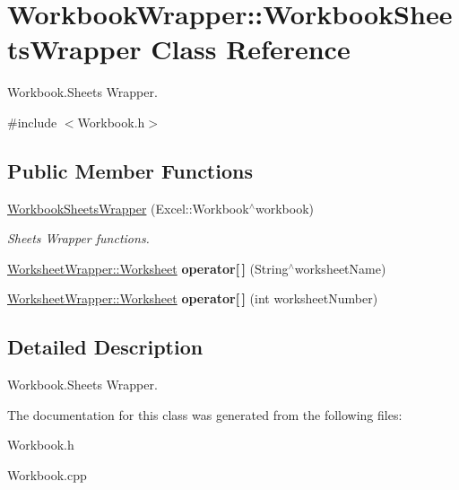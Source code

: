 \hypertarget{class_workbook_wrapper_1_1_workbook_sheets_wrapper}{}\section{Workbook\+Wrapper\+:\+:Workbook\+Sheets\+Wrapper Class Reference}
\label{class_workbook_wrapper_1_1_workbook_sheets_wrapper}


Workbook.\+Sheets Wrapper.  




{\ttfamily \#include $<$Workbook.\+h$>$}

\subsection*{Public Member Functions}
\begin{DoxyCompactItemize}
\item 
\hypertarget{class_workbook_wrapper_1_1_workbook_sheets_wrapper_a4e3774e38d74a6426fe398d6caa99d8b}{}\hyperlink{class_workbook_wrapper_1_1_workbook_sheets_wrapper_a4e3774e38d74a6426fe398d6caa99d8b}{Workbook\+Sheets\+Wrapper} (Excel\+::\+Workbook$^\wedge$workbook)\label{class_workbook_wrapper_1_1_workbook_sheets_wrapper_a4e3774e38d74a6426fe398d6caa99d8b}

\begin{DoxyCompactList}\small\item\em Sheets Wrapper functions. \end{DoxyCompactList}\item 
\hypertarget{class_workbook_wrapper_1_1_workbook_sheets_wrapper_ab5a424591410a7edf0c4af773a0084c4}{}\hyperlink{class_worksheet_wrapper_1_1_worksheet}{Worksheet\+Wrapper\+::\+Worksheet} {\bfseries operator\mbox{[}$\,$\mbox{]}} (String$^\wedge$worksheet\+Name)\label{class_workbook_wrapper_1_1_workbook_sheets_wrapper_ab5a424591410a7edf0c4af773a0084c4}

\item 
\hypertarget{class_workbook_wrapper_1_1_workbook_sheets_wrapper_a5472f7eaa77a4f40dcda1147b9b7bda9}{}\hyperlink{class_worksheet_wrapper_1_1_worksheet}{Worksheet\+Wrapper\+::\+Worksheet} {\bfseries operator\mbox{[}$\,$\mbox{]}} (int worksheet\+Number)\label{class_workbook_wrapper_1_1_workbook_sheets_wrapper_a5472f7eaa77a4f40dcda1147b9b7bda9}

\end{DoxyCompactItemize}


\subsection{Detailed Description}
Workbook.\+Sheets Wrapper. 

The documentation for this class was generated from the following files\+:\begin{DoxyCompactItemize}
\item 
Workbook.\+h\item 
Workbook.\+cpp\end{DoxyCompactItemize}
